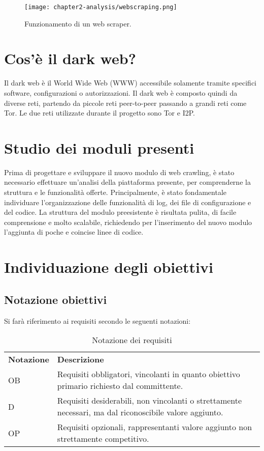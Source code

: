 \begin{figure}[!h] 
    \centering 
    \texttt{[image: chapter2-analysis/webscraping.png]} 
    \caption{Funzionamento di un web scraper.}
\end{figure}

\section{Cos'è il dark web?}
Il dark web è il World Wide Web (WWW) accessibile solamente tramite specifici software, configurazioni o autorizzazioni. Il dark web è composto quindi da diverse reti, partendo da piccole reti peer-to-peer passando a grandi reti come \gls{Tor}. Le due reti utilizzate durante il progetto sono \gls{Tor} e \gls{I2P}.
\section{Studio dei moduli presenti}

Prima di progettare e sviluppare il nuovo modulo di web crawling, è stato necessario effettuare un’analisi della piattaforma presente, per comprenderne la struttura e le funzionalità offerte. Principalmente, è stato fondamentale individuare l'organizzazione delle funzionalità di log, dei file di configurazione e del codice. La struttura del modulo preesistente è risultata pulita, di facile comprensione e molto scalabile, richiedendo per l'inserimento del nuovo modulo l'aggiunta di poche e coincise linee di codice.

\section{Individuazione degli obiettivi}

\subsection{Notazione obiettivi}
Si farà riferimento ai requisiti secondo le seguenti notazioni:
\begin{longtable}{|p{}|p{}|}
	\caption{Notazione dei requisiti}
	\label{tab:notazione-requisiti} \\
	\hline
    \textbf{Notazione}	&	\textbf{Descrizione} \\
    OB			&	Requisiti obbligatori, vincolanti in quanto obiettivo primario richiesto dal committente. \\  
	\hline
    D			&	Requisiti desiderabili, non vincolanti o strettamente necessari, ma dal riconoscibile valore aggiunto. \\ 
	\hline
    OP			&	Requisiti opzionali, rappresentanti valore aggiunto non strettamente competitivo. \\
    \hline
\end{longtable}%

